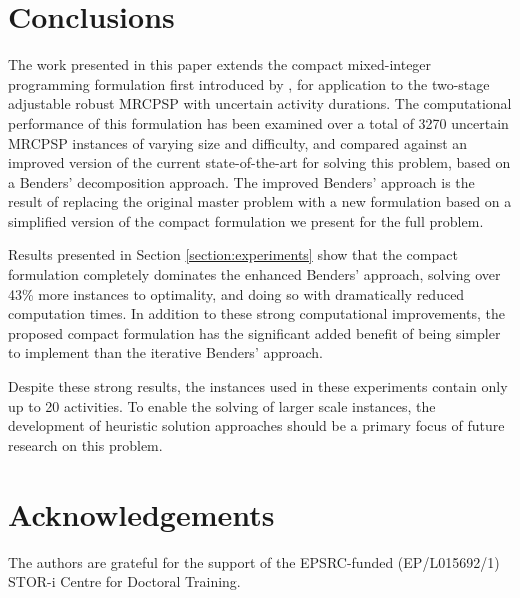 \documentclass[a4paper,abstracton]{scrartcl}
\begin{document}
\section{Conclusions}

The work presented in this paper extends the compact mixed-integer programming formulation first introduced by \cite{bold2021compact}, for application to the two-stage adjustable robust MRCPSP with uncertain activity durations. The computational performance of this formulation has been examined over a total of 3270 uncertain MRCPSP instances of varying size and difficulty, and compared against an improved version of the current state-of-the-art for solving this problem, based on a Benders' decomposition approach. The improved Benders' approach is the result of replacing the original master problem with a new formulation based on a simplified version of the compact formulation we present for the full problem. 

Results presented in Section \ref{section:experiments} show that the compact formulation completely dominates the enhanced Benders' approach, solving over 43\% more instances to optimality, and doing so with dramatically reduced computation times. In addition to these strong computational improvements, the proposed compact formulation has the significant added benefit of being simpler to implement than the iterative Benders' approach.

Despite these strong results, the instances used in these experiments contain only up to 20 activities. To enable the solving of larger scale instances, the development of heuristic solution approaches should be a primary focus of future research on this problem. 

\section*{Acknowledgements}

The authors are grateful for the support of the EPSRC-funded (EP/L015692/1) STOR-i Centre for Doctoral Training.


\end{document}
